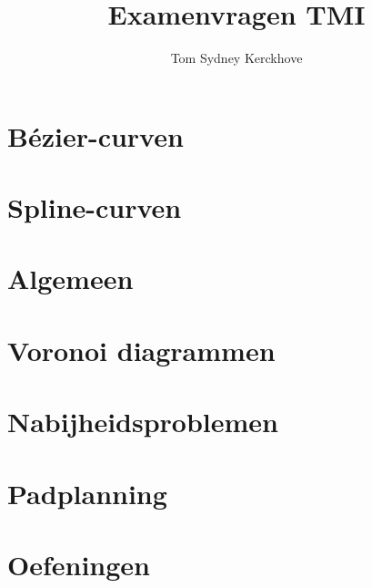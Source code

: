 \documentclass[12pt,a4paper]{article}
\author{Tom Sydney Kerckhove}
\title{Examenvragen TMI}
\begin{document}
\pagebreak



\part{B\'ezier-curven}








\part{Spline-curven}






\part{Algemeen}






\part{Voronoi diagrammen}







\part{Nabijheidsproblemen}



\part{Padplanning}


\part{Oefeningen}











\end{document}
